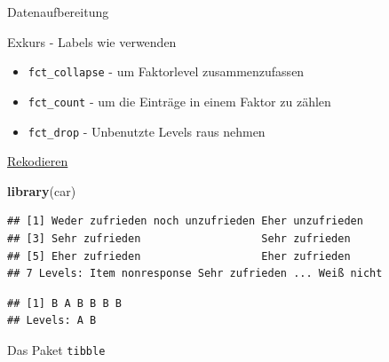 \documentclass[ignorenonframetext,]{beamer}
\newenvironment{Shaded}{}{}
\newcommand{\KeywordTok}[1]{\textcolor[rgb]{0.00,0.44,0.13}{\textbf{{#1}}}}
\newcommand{\StringTok}[1]{\textcolor[rgb]{0.25,0.44,0.63}{{#1}}}
\newcommand{\NormalTok}[1]{{#1}}
\providecommand{\tightlist}{%
\setlength{\itemsep}{0pt}\setlength{\parskip}{0pt}}
\begin{document}
\begin{frame}[fragile]{Datenaufbereitung}
\begin{block}{Exkurs - Labels wie verwenden}
\begin{itemize}
\tightlist
\item
  \texttt{fct\_collapse} - um Faktorlevel zusammenzufassen
\item
  \texttt{fct\_count} - um die Einträge in einem Faktor zu zählen
\item
  \texttt{fct\_drop} - Unbenutzte Levels raus nehmen
\end{itemize}

\end{block}

\begin{block}{\href{https://www.r-bloggers.com/recoding-variables-in-r-pedagogic-considerations/}{Rekodieren}}

\begin{Shaded}
\begin{Highlighting}[]
\KeywordTok{library}\NormalTok{(car)}
\end{Highlighting}
\end{Shaded}

\begin{Shaded}
\end{Shaded}

\begin{verbatim}
## [1] Weder zufrieden noch unzufrieden Eher unzufrieden                
## [3] Sehr zufrieden                   Sehr zufrieden                  
## [5] Eher zufrieden                   Eher zufrieden                  
## 7 Levels: Item nonresponse Sehr zufrieden ... Weiß nicht
\end{verbatim}

\begin{Shaded}
\end{Shaded}

\begin{verbatim}
## [1] B A B B B B
## Levels: A B
\end{verbatim}

\end{block}

\begin{block}{Das Paket \texttt{tibble}}


\end{block}
\end{frame}
\end{document}
